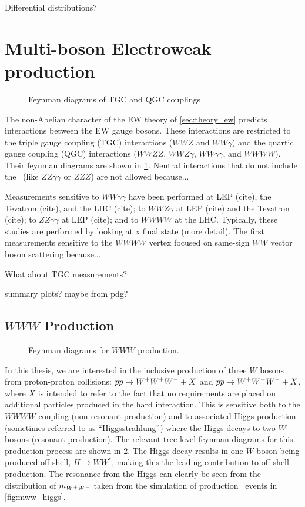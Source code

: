 Differential distributions?


\section{Multi-boson Electroweak production}


\begin{figure}[ht]
\centering
\caption{Feynman diagrams of TGC and QGC couplings}
\label{fig:theory_feynman_couplings}
\end{figure}

The non-Abelian character of the 
EW theory of \sec\ref{sec:theory_ew} predicts interactions
between the EW gauge bosons. These interactions are restricted
to the triple gauge coupling (TGC) interactions ($WWZ$ and $WW\gamma$)
and the quartic gauge coupling (QGC) interactions ($WWZZ$, $WWZ\gamma$,
$WW\gamma\gamma$, and $WWWW$). Their feynman diagrams 
are shown in \fig\ref{fig:theory_feynman_couplings}.
Neutral interactions that do not include the \dubya~(like $ZZ\gamma\gamma$ or $ZZZ$)
are not allowed because... %

Measurements sensitive to $WW\gamma\gamma$
have been performed at LEP (cite), the Tevatron (cite), and the LHC (cite); 
to $WWZ\gamma$ at LEP (cite)
and the Tevatron (cite); to $ZZ\gamma\gamma$ at LEP (cite); 
and to $WWWW$ at the LHC. Typically, these studies are performed
by looking at x final state (more detail). 
The first measurements sensitive to the $WWWW$ vertex focused on 
same-sign $WW$ vector boson scattering because...


What about TGC measurements?

summary plots? maybe from pdg?


\subsection{$WWW$ Production}

\begin{figure}[ht]
\centering
\caption{Feynman diagrams for $WWW$ production.}
\label{fig:theory_feynman_www}
\end{figure}

In this thesis, we are interested in the inclusive production of three
$W$ bosons from proton-proton collisions:
$pp\rightarrow\- W^{+}W^{+}W^{-}+X$ and $pp\rightarrow W^{+}W^{-}W^{-}\allowbreak +X$, 
where $X$ is intended to refer to the fact that no requirements are 
placed on additional particles produced in the hard interaction.
This is sensitive both
to the $WWWW$ coupling (non-resonant production) 
and to associated Higgs production (sometimes referred to as
``Higgsstrahlung'') where the Higgs decays to two
$W$ bosons (resonant production). 
The relevant
tree-level feynman diagrams for this production process are shown in 
\fig\ref{fig:theory_feynman_www}.
The Higgs decay results in one $W$ boson being produced off-shell,
$H\rightarrow WW^*$, making this the leading contribution to off-shell
production.  
The resonance from the Higgs can clearly be seen from the 
distribution of $m_{W^{+}W^{-}}$ taken from the simulation of production \www~events
in \fig\ref{fig:mww_higgs}.

